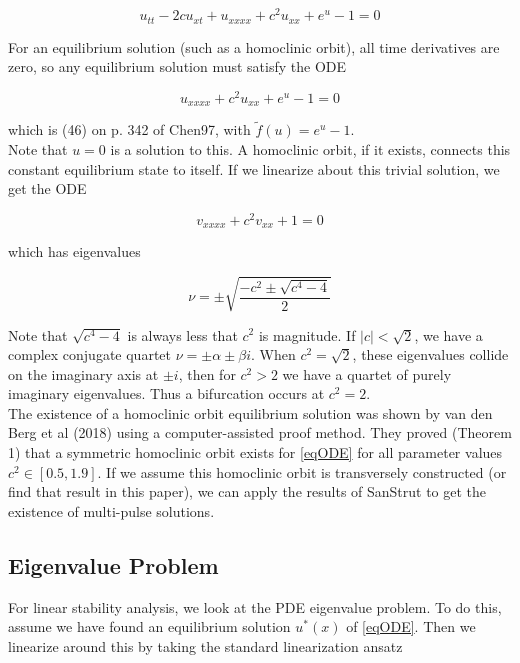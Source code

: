 \documentclass[12pt]{article}
\begin{document}
\begin{equation}\label{susp3}
u_{tt} - 2 c u_{x t} + u_{xxxx} + c^2 u_{xx} + e^{u} - 1 = 0
\end{equation}

For an equilibrium solution (such as a homoclinic orbit), all time derivatives are zero, so any equilibrium solution must satisfy the ODE

\begin{equation}\label{eqODE}
u_{xxxx} + c^2 u_{xx} + e^{u} - 1 = 0
\end{equation}

which is (46) on p. 342 of Chen97, with $\tilde{f}(u) = e^u - 1$.\\

Note that $u = 0$ is a solution to this. A homoclinic orbit, if it exists, connects this constant equilibrium state to itself. If we linearize about this trivial solution, we get the ODE

\begin{equation}
v_{xxxx} + c^2 v_{xx} + 1 = 0
\end{equation}

which has eigenvalues

\begin{equation}
\nu = \pm \sqrt{\frac{-c^2 \pm \sqrt{c^4 - 4}}{2} }
\end{equation}

Note that $\sqrt{c^4 - 4}$ is always less that $c^2$ is magnitude. If $|c| < \sqrt{2}$, we have a complex conjugate quartet $\nu = \pm \alpha \pm \beta i$. When $c^2 = \sqrt{2}$, these eigenvalues collide on the imaginary axis at $\pm i$, then for $c^2 > 2$ we have a quartet of purely imaginary eigenvalues. Thus a bifurcation occurs at $c^2 = 2$.\\

The existence of a homoclinic orbit equilibrium solution was shown by van den Berg et al (2018) using a computer-assisted proof method. They proved (Theorem 1) that a symmetric homoclinic orbit exists for \eqref{eqODE} for all parameter values $c^2 \in [0.5, 1.9]$. If we assume this homoclinic orbit is transversely constructed (or find that result in this paper), we can apply the results of SanStrut to get the existence of multi-pulse solutions.

\subsection{Eigenvalue Problem}

For linear stability analysis, we look at the PDE eigenvalue problem. To do this, assume we have found an equilibrium solution $u^*(x)$ of \eqref{eqODE}. Then we linearize around this by taking the standard linearization ansatz
\end{document}
